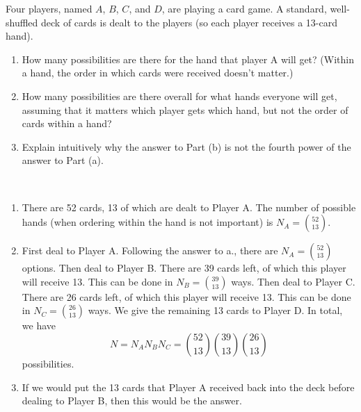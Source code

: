 
\setcounter{theorem}{8}

\begin{exercise}[BH.1.12]
	Four players, named $A$, $B$, $C$, and $D$, are playing a card game. A standard, well-shuffled deck of cards is dealt to the players (so each player receives a 13-card hand).
	\begin{enumerate}
		\item How many possibilities are there for the hand that player A will get? (Within a hand, the order in which cards were received doesn’t matter.)
		\item How many possibilities are there overall for what hands everyone will get, assuming that it matters which player gets which hand, but not the order of cards within a hand?
		\item Explain intuitively why the answer to Part (b) is not the fourth power of the answer to Part (a).
	\end{enumerate}
\begin{solution}~
	\begin{enumerate}
		\item There are 52 cards, 13 of which are dealt to Player A. The number of possible hands (when ordering within the hand is not important) is $N_{A}={52 \choose 13}$.
	 	\item First deal to Player A. Following the answer to a., there are $N_{A}={52 \choose 13}$ options. Then deal to Player B. There are 39 cards left, of which this player will receive 13. This can be done in $N_{B} ={39 \choose 13}$ ways. Then deal to Player C. There are 26 cards left, of which this player will receive 13. This can be done in $N_{C}={26\choose 13}$ ways. We give the remaining 13 cards to Player D. In total, we have $$N = N_{A}N_{B}N_{C} = {52 \choose 13}{39 \choose 13}{26 \choose 13}$$ possibilities.
	 	\item If we would put the 13 cards that Player A received back into the deck before dealing to Player B, then this would be the answer.
	\end{enumerate}
\end{solution}
\end{exercise}


